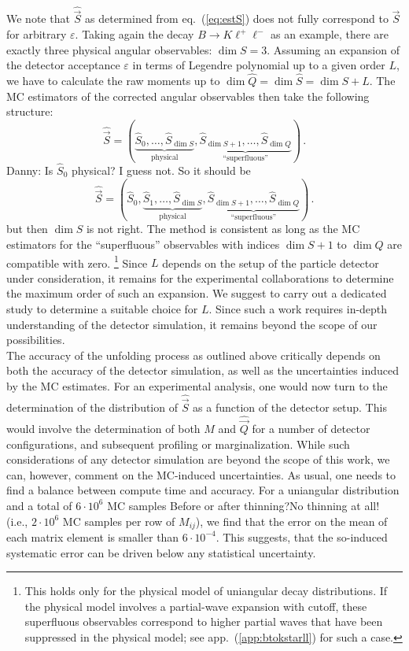 \documentclass[aps,prd,reprint,nofootinbib,preprintnumbers]{revtex4}
\newcommand{\est}[1]{\widehat{#1}}
\newcommand{\refapp}[1]{app.~(\ref{app:#1})}
\newcommand{\refeq}[1]{eq.~(\ref{eq:#1})}
\let\eps\varepsilon
\newcommand{\vecest}[1]{\widehat{\vec{#1}}}
\newcommand{\danny}[1]{{\color{purple}#1}}
\newcommand{\fred}[1]{{\color{brown!85!black}#1}}
\newcommand{\add}[1]{\textcolor{green!85!black}{#1}}
\begin{document}
We note that $\vecest{S}$ as determined from \refeq{estS} does not fully correspond to $\vec{S}$
for arbitrary $\eps$. Taking again the decay $B\to K\ell^+\ell^-$
as an example, \add{there are exactly three physical angular observables:} $\dim S = 3$.
Assuming an expansion of the detector acceptance $\eps$
in terms of Legendre polynomial up to a given order $L$, we have to calculate the raw moments up
to $\dim \est{Q} = \dim \est{S} = \dim S + L$. The MC estimators of the corrected angular observables
then take the following structure:
\begin{equation}
    \vecest{S} = ( \underbrace{\est{S}_0, \dots, \est{S}_{\dim S}}_\text{physical}, \underbrace{\est{S}_{\dim S + 1}, \dots, \est{S}_{\dim Q}}_\text{``superfluous''})\,.
\end{equation}
\fred{Danny: Is $\est{S}_0$ physical? I guess not. So it should be
\begin{equation}
    \vecest{S} = ( \est{S}_0, \underbrace{\est{S}_1, \dots, \est{S}_{\dim S}}_\text{physical}, \underbrace{\est{S}_{\dim S + 1}, \dots, \est{S}_{\dim Q}}_\text{``superfluous''})\,.
\end{equation}
but then $\dim S$ is not right.
}
The method is consistent as long as the MC estimators for the ``superfluous'' observables with indices $\dim S + 1$ to $\dim Q$
are compatible with zero. \footnote{This holds only for the physical model of uniangular decay distributions. If the physical
    model involves a partial-wave expansion with cutoff, these superfluous observables
correspond to higher partial waves that have been suppressed in the physical model; see \refapp{btokstarll} for such a case.}
Since $L$ depends on the setup of the particle detector under consideration, it remains for
the experimental collaborations to determine the maximum order of such an expansion.
\add{We suggest to carry out a dedicated study to determine a suitable choice for $L$.
Since such a work requires in-depth understanding of the detector simulation, it remains
beyond the scope of our possibilities.}\\

The accuracy of the unfolding process as outlined above critically depends on both the accuracy
of the detector simulation, as well as the uncertainties induced by the MC estimates.
For an experimental analysis, one would now turn to the determination of the distribution of $\vecest{S}$
as a function of the detector setup. This would involve the determination of both $M$ and $\vecest{Q}$ for a number of
detector configurations, and subsequent profiling or marginalization.
While such considerations of any detector simulation are beyond the scope of this work, we can, however,
comment on the MC-induced uncertainties. As usual, one needs to find a balance between
compute time and accuracy. For a uniangular distribution and a total of $6\cdot 10^6$ MC
samples \fred{Before or after thinning?}\danny{No thinning at all!} (i.e., $2 \cdot 10^6$ MC samples per row of $M_{ij}$), we find that the error on the mean
of each matrix element is smaller than $6\cdot 10^{-4}$. \add{This suggests, that the so-induced
systematic error can be driven below any statistical uncertainty.}
\end{document}
